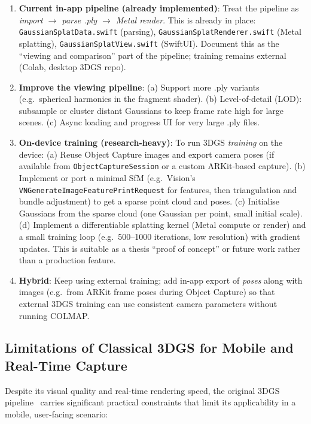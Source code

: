\begin{enumerate}
    \item \textbf{Current in-app pipeline (already implemented)}: Treat the pipeline as \emph{import $\rightarrow$ parse .ply $\rightarrow$ Metal render}. This is already in place: \texttt{GaussianSplatData.swift} (parsing), \texttt{GaussianSplatRenderer.swift} (Metal splatting), \texttt{GaussianSplatView.swift} (SwiftUI). Document this as the ``viewing and comparison'' part of the pipeline; training remains external (Colab, desktop 3DGS repo).
    \item \textbf{Improve the viewing pipeline}: (a) Support more .ply variants (e.g.\ spherical harmonics in the fragment shader). (b) Level-of-detail (LOD): subsample or cluster distant Gaussians to keep frame rate high for large scenes. (c) Async loading and progress UI for very large .ply files.
    \item \textbf{On-device training (research-heavy)}: To run 3DGS \emph{training} on the device: (a) Reuse Object Capture images and export camera poses (if available from \texttt{ObjectCaptureSession} or a custom ARKit-based capture). (b) Implement or port a minimal SfM (e.g.\ Vision's \texttt{VNGenerateImageFeaturePrintRequest} for features, then triangulation and bundle adjustment) to get a sparse point cloud and poses. (c) Initialise Gaussians from the sparse cloud (one Gaussian per point, small initial scale). (d) Implement a differentiable splatting kernel (Metal compute or render) and a small training loop (e.g.\ 500--1000 iterations, low resolution) with gradient updates. This is suitable as a thesis ``proof of concept'' or future work rather than a production feature.
    \item \textbf{Hybrid}: Keep using external training; add in-app export of \emph{poses} along with images (e.g.\ from ARKit frame poses during Object Capture) so that external 3DGS training can use consistent camera parameters without running COLMAP.
\end{enumerate}


\subsection{Limitations of Classical 3DGS for Mobile and Real-Time Capture}
\label{subsec:3dgs_limitations}

Despite its visual quality and real-time rendering speed, the original 3DGS pipeline~\cite{kerbl20233dgs} carries significant practical constraints that limit its applicability in a mobile, user-facing scenario:

